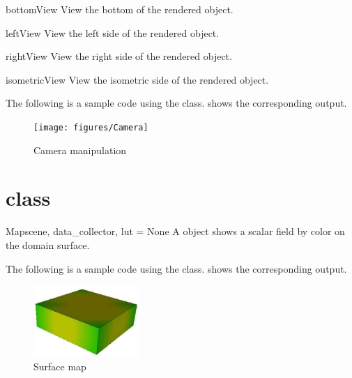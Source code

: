 \begin{methoddesc}[Camera]{bottomView}{}
View the bottom of the rendered object.
\end{methoddesc}

\begin{methoddesc}[Camera]{leftView}{}
View the left side of the rendered object.
\end{methoddesc}

\begin{methoddesc}[Camera]{rightView}{}
View the right side of the rendered object.
\end{methoddesc}

\begin{methoddesc}[Camera]{isometricView}{}
View the isometric side of the rendered object.
\end{methoddesc}

The following is a sample code using the \Camera class. 
 shows the corresponding output. 


\begin{figure}[ht]
\begin{center}
\texttt{[image: figures/Camera]}
\end{center}
\caption{Camera manipulation}
\label{fig:camera.1}
\end{figure}

\section{\Map class}
\begin{classdesc}{Map}{scene, data_collector, lut = None}
A \Map object shows a scalar field by color on the domain surface.
\end{classdesc}

The following is a sample code using the \Map class. 
 shows the corresponding output. 


\begin{figure}[ht]
\begin{center}
\includegraphics[width=40mm]{figures/Map}
\end{center}
\caption{Surface map}
\label{fig:map.1}
\end{figure}

